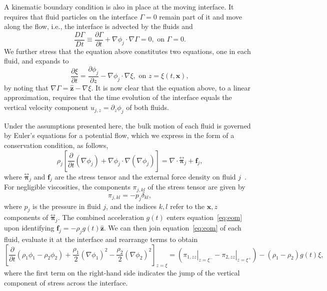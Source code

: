 \documentclass[a4paper]{jpconf}
\newcommand{\unvec}[1]{\bm{\hat{#1}}}
\newcommand{\tensor}[1]{\stackrel{\leftrightarrow}{#1}}
\begin{document}
A kinematic boundary condition is also in place at the moving interface. It requires that fluid particles on the interface $\Gamma=0$ remain part of it and move along the flow, i.e., the interface is advected by the fluids and~\cite{Landau2013Fluid6,serrin1959mathematical}
\begin{equation}
    \label{eq:kinBC}
    \frac{D\Gamma}{Dt}\equiv \frac{\partial \Gamma}{\partial t}+\nabla\phi_j\cdot\nabla\Gamma=0,\text{ on }\Gamma=0.
\end{equation}
We further stress that the equation above constitutes two equations, one in each fluid, and expands to
\begin{equation}
    \label{eq:kinematic}
    \frac{\partial\xi}{\partial t} = \frac{\partial\phi_j}{\partial z}-\nabla\phi_j\cdot\nabla\xi, \text{ on }z=\xi(t,\bm{x}),
\end{equation}
by noting that $\nabla\Gamma=\unvec{z}-\nabla\xi$.
It is now clear that the equation above, to a linear approximation, requires that the time evolution of the interface equals the vertical velocity component $u_{j,z}=\partial_z\phi_j$ of both fluids.

Under the assumptions presented here, the bulk motion of each fluid is governed by Euler's equations for a potential flow, which we express in the form of a conservation condition, as follows,
\begin{equation}
\label{eq:eom}
    \rho_j\left[\frac{\partial}{\partial t}(\nabla\phi_j)+\nabla\phi_j\cdot\nabla\left(\nabla\phi_j\right)\right]=\nabla\cdot\bm{\tensor{\pi}}_j+\bm{f}_j,
\end{equation}
where $\bm{\tensor{\pi}}_j$ and $\bm{f}_j$ are the stress tensor and the external force density on fluid $j$~\cite{Landau2013Fluid6,Kumar94}. For negligible viscosities, the components $\pi_{j,kl}$ of the stress tensor are given by
\begin{equation}
\label{eq:stressTensor}
    \pi_{j,kl}=-p_j\delta_{kl},
\end{equation}
where $p_j$ is the pressure in fluid $j$, and the indices $k,l$ refer to the $\bm{x},z$ components of $\bm{\tensor{\pi}}_j$. The combined acceleration $g(t)$ enters equation~\eqref{eq:eom} upon identifying $\bm{f}_j=-\rho_j g(t)\unvec{z}$. We can then join equation~\eqref{eq:eom} of each fluid, evaluate it at the interface and rearrange terms to obtain
\begin{equation}
\label{eq:eom12}
    \left[\frac{\partial}{\partial t}\left(\rho_1\phi_1-\rho_2\phi_2\right)+\frac{\rho_1}{2}\left(\nabla\phi_1\right)^2-\frac{\rho_2}{2}\left(\nabla\phi_2\right)^2\right]_{z=\xi}
    =\left(\left.\pi_{1,zz}\right|_{z=\xi^-}-\left.\pi_{2,zz}\right|_{z=\xi^+}\right)-(\rho_1-\rho_2)g(t)\xi,
\end{equation}
where the first term on the right-hand side indicates the jump of the vertical component of stress across the interface.
\end{document}
